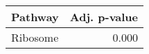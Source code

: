 \begin{tabular}{lr}
\toprule
  Pathway &  Adj. p-value \\
\midrule
 Ribosome &         0.000 \\
\bottomrule
\end{tabular}
